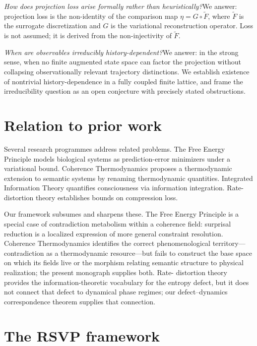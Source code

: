 \documentclass[12pt, oneside]{memoir}
\newcommand{\Ft}{\widetilde{F}}
\begin{document}
\medskip\noindent\textit{How does projection loss arise formally rather than
heuristically?}\enspace We answer: projection loss is the non-identity of the comparison
map $\eta = G \circ \Ft$, where $\Ft$ is the surrogate discretization and $G$ is the
variational reconstruction operator.  Loss is not assumed; it is derived from the
non-injectivity of $\Ft$.

\medskip\noindent\textit{When are observables irreducibly history-dependent?}\enspace We
answer: in the strong sense, when no finite augmented state space can factor the
projection without collapsing observationally relevant trajectory distinctions.  We
establish existence of nontrivial history-dependence in a fully coupled finite lattice,
and frame the irreducibility question as an open conjecture with precisely stated
obstructions.

\section{Relation to prior work}

Several research programmes address related problems.  The Free Energy Principle
\cite{friston2010} models biological systems as prediction-error minimizers under a
variational bound.  Coherence Thermodynamics \cite{barton2025} proposes a thermodynamic
extension to semantic systems by renaming thermodynamic quantities.  Integrated
Information Theory \cite{tononi2004} quantifies consciousness via information integration.
Rate-distortion theory \cite{shannon1948, berger1971} establishes bounds on compression
loss.

Our framework subsumes and sharpens these.  The Free Energy Principle is a special case
of contradiction metabolism within a coherence field: surprisal reduction is a localized
expression of more general constraint resolution.  Coherence Thermodynamics identifies
the correct phenomenological territory---contradiction as a thermodynamic resource---but
fails to construct the base space on which its fields live or the morphism relating
semantic structure to physical realization; the present monograph supplies both.  Rate-
distortion theory provides the information-theoretic vocabulary for the entropy defect,
but it does not connect that defect to dynamical phase regimes; our defect--dynamics
correspondence theorem supplies that connection.

\section{The RSVP framework}
\end{document}
